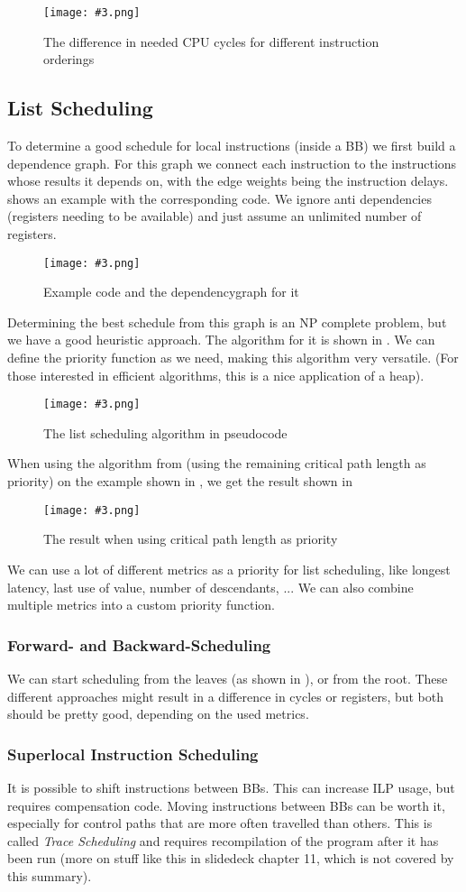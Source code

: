 \documentclass{article}
\newcommand{\fig}[4]{
	\begin{figure}[#1]
		\center
		\texttt{[image: \#3.png]}
		\caption{#4}
		\label{fig:#3}
	\end{figure}
	}
\begin{document}
\fig{h}{}{superscalar}{The difference in needed CPU cycles for different instruction orderings}

\subsection{List Scheduling}
To determine a good schedule for local instructions (inside a BB) we first build a dependence graph.
For this graph we connect each instruction to the instructions whose results it depends on, with the edge weights being the instruction delays.
 shows an example with the corresponding code.
We ignore anti dependencies (registers needing to be available) and just assume an unlimited number of registers.

\fig{h}{}{dependencygraph}{Example code and the dependencygraph for it}

Determining the best schedule from this graph is an NP complete problem, but we have a good heuristic approach.
The algorithm for it is shown in .
We can define the priority function as we need, making this algorithm very versatile.
(For those interested in efficient algorithms, this is a nice application of a heap).

\fig{h}{}{listscheduling}{The list scheduling algorithm in pseudocode}

When using the algorithm from  (using the remaining critical path length as priority) on the example shown in , we get the result shown in 

\fig{h}{}{scheduleresult}{The result when using critical path length as priority}

We can use a lot of different metrics as a priority for list scheduling, like longest latency, last use of value, number of descendants, ...
We can also combine multiple metrics into a custom priority function.

\subsubsection{Forward- and Backward-Scheduling}
We can start scheduling from the leaves (as shown in ), or from the root.
These different approaches might result in a difference in cycles or registers, but both should be pretty good, depending on the used metrics.

\subsubsection{Superlocal Instruction Scheduling}
It is possible to shift instructions between BBs.
This can increase ILP usage, but requires compensation code.
Moving instructions between BBs can be worth it, especially for control paths that are more often travelled than others.
This is called \emph{Trace Scheduling} and requires recompilation of the program after it has been run (more on stuff like this in slidedeck chapter 11, which is not covered by this summary).
\end{document}
